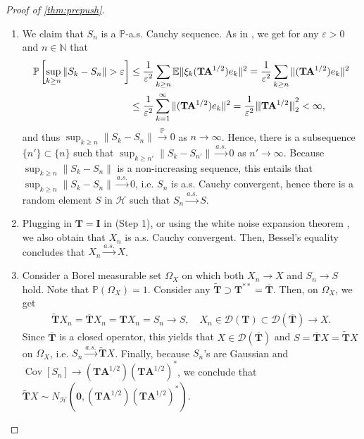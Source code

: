 \documentclass[noinfoline]{imsart}\setcounter{tocdepth}{2}
\renewcommand{\b}[1]{\mathbb{#1}} %
\newcommand{\m}[1]{\mathbf{#1}} %
\renewcommand{\c}[1]{\mathcal{#1}} %
\DeclareMathOperator*{\Cov}{Cov}
\newcommand{\vertii}[1]{{\vert\kern-0.25ex\vert\kern-0.25ex\vert #1 
    \vert\kern-0.25ex\vert\kern-0.25ex\vert}} %
\theoremstyle{plain}
\begin{document}
\begin{proof}[Proof of \cref{thm:prepush}]
\begin{enumerate}
\item [(Step 1)] We claim that $S_{n}$ is a $\b{P}$-a.s. Cauchy sequence. As in \cite[Lemma 3.15]{kallenberg1997foundations}, we get for any $\varepsilon > 0$ and $n \in \b{N}$ that
\begin{align*}
    \b{P} \left[ \sup_{k \ge n} \|S_{k} - S_{n} \| > \varepsilon \right] &\le \frac{1}{\varepsilon^{2}} \sum_{k \ge n} \b{E} \|\xi_{k} (\m{T} \m{A}^{1/2}) e_{k}\|^{2} = \frac{1}{\varepsilon^{2}} \sum_{k \ge n} \|(\m{T} \m{A}^{1/2}) e_{k}\|^{2} \\
    &\le \frac{1}{\varepsilon^{2}} \sum_{k=1}^{\infty} \|(\m{T} \m{A}^{1/2}) e_{k}\|^{2} = \frac{1}{\varepsilon^{2}} \vertii{\m{T} \m{A}^{1/2}}_{2}^{2} < \infty,
\end{align*}
and thus $\sup_{k \ge n} \|S_{k} - S_{n} \| \stackrel{\b{P}}{\to} 0$ as $n \to \infty$. Hence, there is a subsequence $\{n'\} \subset \{n\}$ such that $\sup_{k \ge n'} \|S_{k} - S_{n'} \| \stackrel{a.s.}{\to} 0$ as $n' \to \infty$. Because $\sup_{k \ge n} \|S_{k} - S_{n} \|$ is a non-increasing sequence, this entails that $\sup_{k \ge n} \|S_{k} - S_{n} \| \stackrel{a.s.}{\to} 0$, i.e. $S_{n}$ is a.s. Cauchy convergent, hence there is a random element $S$ in $\c{H}$ such that $S_{n} \stackrel{a.s.}{\to} S$.
\item [(Step 2)] Plugging in $\m{T} = \m{I}$ in (Step 1), or using the white noise expansion theorem \cite{da2006introduction}, we also obtain that $X_{n}$ is a.s. Cauchy convergent. Then, Bessel's equality concludes that $X_{n} \stackrel{a.s.}{\to} X$.
\item [(Step 3)] Consider a Borel measurable set $\Omega_{X}$ on which both $X_{n} \to X$ and $S_{n} \to S$ hold. Note that $\b{P}(\Omega_{X}) = 1$. Consider any $\tilde{\m{T}} \supset \m{T}^{**} = \overline{\m{T}}$. Then, on $\Omega_{X}$, we get
\begin{align*}
    \tilde{\m{T}} X_{n} = \overline{\m{T}} X_{n} = \m{T} X_{n} = S_{n} \to S, \quad X_{n} \in \c{D}(\m{T}) \subset \c{D}(\overline{\m{T}}) \to X.
\end{align*}
Since $\overline{\m{T}}$ is a closed operator, this yields that $X \in \c{D}(\overline{\m{T}})$ and $S = \overline{\m{T}} X = \tilde{\m{T}} X$ on $\Omega_{X}$, i.e. $S_{n} \stackrel{a.s.}{\to} \tilde{\m{T}} X$. Finally, because $S_{n}$'s are Gaussian and $\Cov[S_{n}] \to (\m{T} \m{A}^{1/2})(\m{T} \m{A}^{1/2})^{*}$, we conclude that $\tilde{\m{T}} X \sim N_{\c{H}}(\m{0}, (\m{T} \m{A}^{1/2})(\m{T} \m{A}^{1/2})^{*})$.
\end{enumerate}
\end{proof}
\end{document}
